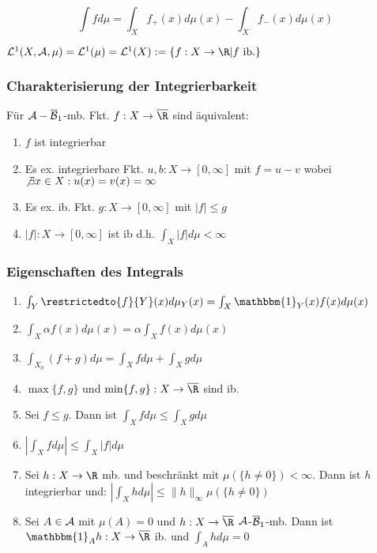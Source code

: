 $$\int f d\mu = \int_X f_+(x) d\mu(x) - \int_X f_-(x) d\mu(x)$$

$\L^1(X,\A,\mu) = \L^1(\mu) = \L^1(X) := \{ f : X \to \R | f \text{ ib.}\}$

\subsubsection*{Charakterisierung der Integrierbarkeit}

Für $\mathcal{A}-\overline{\mathcal{B}}_1$-mb. Fkt. $f : X \to \overline\R$ sind äquivalent:

\begin{enumerate}[label=(\alph*)]
	\item $f$ ist integrierbar
	\item Es ex. integrierbare Fkt. $u, b : X \to [0,\infty]$ mit $f=u-v$ wobei $\not\exists x \in X : u(x)=v(x)=\infty$
	\item Es ex. ib. Fkt. $g : X \to [0,\infty]$ mit $|f| \leq g$
	\item $|f| : X \to [0,\infty]$ ist ib d.h. $\int_X |f| d\mu < \infty$
\end{enumerate}

\subsubsection*{Eigenschaften des Integrals}

\begin{enumerate}[label=(\alph*)]
	\item $\int_Y \restrictedto{f}{Y}(x) d\mu_Y(x) = \int_X \mathbbm{1}_Y(x) f(x) d\mu(x)$
	\item $\int_X \alpha f(x) d\mu(x) = \alpha \int_X f(x) d\mu(x)$
	\item $\int_{X_0} (f + g) d\mu = \int_X f d\mu + \int_X g d\mu$
	\item $\max\{f,g\}$ und $\min\{f,g\} : X \to \overline\R$ sind ib.
	\item Sei $f \leq g$. Dann ist $\int_X f d\mu \leq \int_X g d\mu$
	\item $|\int_X f d\mu| \leq \int_X |f| d\mu$
	\item Sei $h : X \to \R$ mb. und beschränkt mit $\mu(\{h \neq 0\}) < \infty$. Dann ist $h$ integrierbar und: $|\int_X h d\mu| \leq \|h\|_\infty \mu(\{h \neq 0\})$
	\item Sei $A \in \mathcal{A}$ mit $\mu(A) = 0$ und $h : X \to \overline\R$ $\mathcal{A}$-$\overline{\mathcal{B}}_1$-mb. Dann ist $\mathbbm{1}_A h : X \to \overline\R$ ib. und $\int_A h d\mu = 0$
\end{enumerate}

